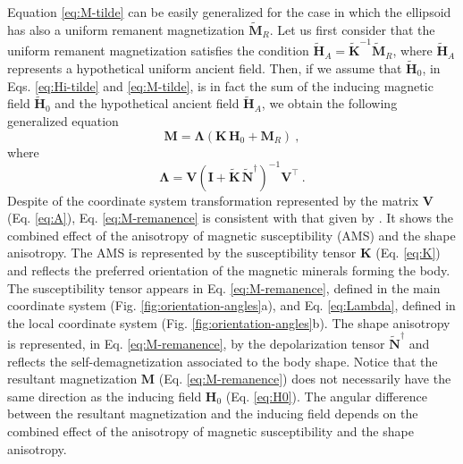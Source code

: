 \documentclass[gmd, manuscript]{copernicus}
\providecommand{\DIFaddend}{} %
\begin{document}
\DIFaddend Equation \ref{eq:M-tilde} can be easily generalized for the case in
which the ellipsoid has also a uniform remanent magnetization
$\tilde{\mathbf{M}}_{R}$. Let us first consider that
the uniform remanent magnetization satisfies the condition
$\tilde{\mathbf{H}}_{A} = \tilde{\mathbf{K}}^{-1} \tilde{\mathbf{M}}_{R}$,
where $\tilde{\mathbf{H}}_{A}$ represents a hypothetical
uniform ancient field. Then, if we assume that $\tilde{\mathbf{H}}_{0}$,
in Eqs. \ref{eq:Hi-tilde} and \ref{eq:M-tilde},
is in fact the sum of the inducing magnetic field $\tilde{\mathbf{H}}_{0}$
and the hypothetical ancient field $\tilde{\mathbf{H}}_{A}$, we obtain the
following generalized equation
\begin{equation}
\mathbf{M} = \mathbf{\Lambda}
\left(\mathbf{K} \, \mathbf{H}_{0} + \mathbf{M}_{R} \right) \: ,
\label{eq:M-remanence}
\end{equation}
where
\begin{equation}
\mathbf{\Lambda} = \mathbf{V}
\left( \mathbf{I} + \tilde{\mathbf{K}} \, \tilde{\mathbf{N}}^{\dagger} \right)^{-1}
\mathbf{V}^{\top} \: .
\label{eq:Lambda}
\end{equation}
Despite of the coordinate system transformation represented by the
matrix $\mathbf{V}$ (Eq. \ref{eq:A}),
Eq. \ref{eq:M-remanence} is consistent with that given by
\citet[Eq. ~38]{clark1986}. It shows the combined effect of the
anisotropy of magnetic susceptibility (AMS) and the shape anisotropy.
The AMS is represented by the susceptibility tensor $\mathbf{K}$
(Eq. \ref{eq:K}) and reflects the
preferred orientation of the magnetic minerals forming the
body. The susceptibility tensor appears in Eq. \ref{eq:M-remanence},
defined in the main coordinate system (Fig. \ref{fig:orientation-angles}a),
and Eq. \ref{eq:Lambda}, defined in the local coordinate system
(Fig. \ref{fig:orientation-angles}b).
The shape anisotropy is represented, in Eq. \ref{eq:M-remanence}, by the
depolarization tensor $\tilde{\mathbf{N}}^{\dagger}$ and
reflects the self-demagnetization associated to the body shape.
Notice that the resultant magnetization $\mathbf{M}$
(Eq. \ref{eq:M-remanence}) does not necessarily have
the same direction as the inducing field $\mathbf{H}_{0}$
(Eq. \ref{eq:H0}).
The angular difference between the resultant magnetization
and the inducing field depends on the combined effect of the
anisotropy of magnetic susceptibility and the shape anisotropy.
\end{document}

